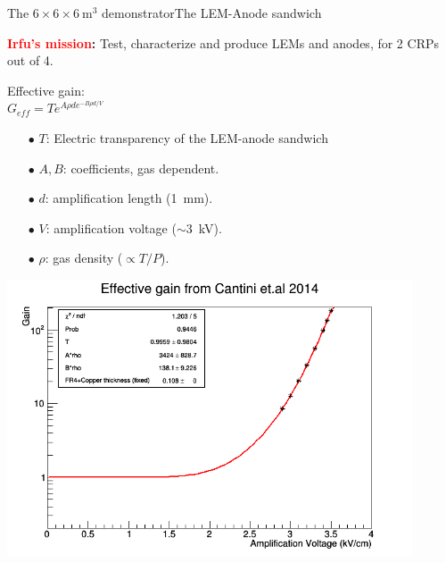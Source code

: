 \documentclass[10pt]{beamer}
\begin{document}
    \begin{frame}{The \texorpdfstring{$6 \times 6 \times \SI{6}{\meter\cubed}$}{666}
    		demonstrator}{The LEM-Anode sandwich}
    	\begin{scriptsize}
		     \textbf{\textcolor{red}{Irfu's mission}: }Test, characterize and produce  LEMs and anodes, for 2 CRPs out of 4.\\\vfill
	   		\begin{minipage}{0.48\textwidth}
	   			Effective gain:\\
	   			\centering  $G_{eff} = Te^{A\rho d e^{-B\rho d/V}}$\\
    			\begin{itemize}
    				\item[$\bullet$] $T$: Electric transparency of the LEM-anode sandwich
    				\item[$\bullet$] $A,B$: coefficients, gas dependent.
    				\item[$\bullet$] $d$: amplification length (\SI{1}{\milli\meter}).
    				\item[$\bullet$] $V$: amplification voltage ($\sim$\SI{3}{\kilo\volt}).
    				\item[$\bullet$] $\rho$: gas density ($\propto T/P$).
    			\end{itemize}
	   			\vfill
				\includegraphics[width=0.9\textwidth]{figures/666/3L_gain.png}
	   		\end{minipage}\hfill
	   		\begin{minipage}{0.48\textwidth}

\end{minipage}
\end{scriptsize}
\end{frame}
\end{document}
